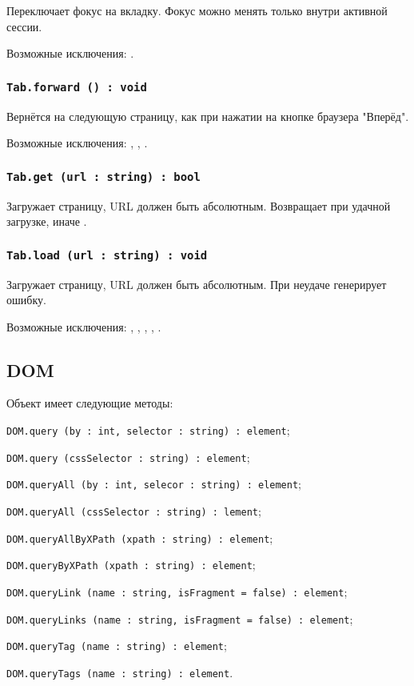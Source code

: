 Переключает фокус на вкладку. Фокус можно менять только внутри активной сессии.

Возможные исключения: .

\subsubsection{\lstinline|Tab.forward () : void|}

Вернётся на следующую страницу, как при нажатии на кнопке браузера "Вперёд".

Возможные исключения: , , .

\subsubsection{\lstinline|Tab.get (url : string) : bool|}

Загружает страницу, URL должен быть абсолютным. Возвращает \true{} при удачной загрузке, иначе \false.

\subsubsection{\lstinline|Tab.load (url : string) : void|}

Загружает страницу, URL должен быть абсолютным. При неудаче генерирует ошибку.

Возможные исключения: , , , , .

\subsection{{\color{orange} DOM}}

Объект \dom{} имеет следующие методы:
\begin{icItems}
	\item \lstinline|DOM.query (by : int, selector : string) : element|;
	\item \lstinline|DOM.query (cssSelector : string) : element|;
	\item \lstinline|DOM.queryAll (by : int, selecor : string) : element|;
	\item \lstinline|DOM.queryAll (cssSelector : string) : lement|;
	\item \lstinline|DOM.queryAllByXPath (xpath : string) : element|;
	\item \lstinline|DOM.queryByXPath (xpath : string) : element|;
	\item \lstinline|DOM.queryLink (name : string, isFragment = false) : element|;
	\item \lstinline|DOM.queryLinks (name : string, isFragment = false) : element|;
	\item \lstinline|DOM.queryTag (name : string) : element|;
	\item \lstinline|DOM.queryTags (name : string) : element|.
\end{icItems}

